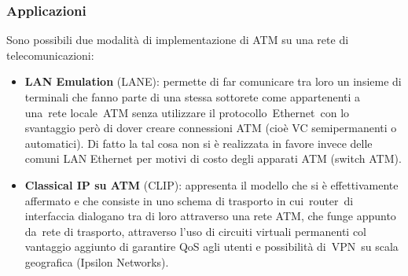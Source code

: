 \documentclass{article}
\begin{document}
\subsubsection{Applicazioni}
Sono possibili due modalità di implementazione di ATM su una rete di telecomunicazioni:\\
\begin{itemize}
    \item \textbf{LAN Emulation} (LANE): permette di far comunicare tra loro un insieme di terminali che 
    fanno parte di una stessa sottorete come appartenenti a una rete locale ATM senza utilizzare il 
    protocollo Ethernet con lo svantaggio però di dover creare connessioni ATM (cioè VC semipermanenti o 
    automatici). Di fatto la tal cosa non si è realizzata in favore invece delle comuni LAN Ethernet per 
    motivi di costo degli apparati ATM (switch ATM).
    \item \textbf{Classical IP su ATM} (CLIP): appresenta il modello che si è effettivamente affermato e 
    che consiste in uno schema di trasporto in cui router di interfaccia dialogano tra di loro attraverso 
    una rete ATM, che funge appunto da rete di trasporto, attraverso l'uso di circuiti virtuali permanenti 
    col vantaggio aggiunto di garantire QoS agli utenti e possibilità di VPN su scala geografica 
    (Ipsilon Networks).
\end{itemize}
\end{document}
